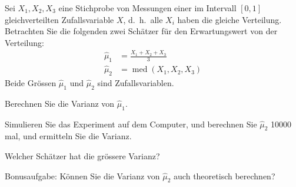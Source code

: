 Sei $X_1,X_2,X_3$ eine Stichprobe von Messungen einer im
Intervall $[0,1]$ gleichverteilten Zufallsvariable $X$,
d.~h.~alle $X_i$ haben die gleiche Verteilung. Betrachten Sie die folgenden
zwei Schätzer für den Erwartungswert von der Verteilung:
\begin{align*}
\hat\mu_1&=\frac{X_1+X_2+X_3}3\\
\hat\mu_2&=\operatorname{med}(X_1,X_2,X_3)
\end{align*}
Beide Grössen $\hat\mu_1$ und $\hat\mu_2$ sind Zufallsvariablen.
\begin{teilaufgaben}
\item
Berechnen Sie die Varianz von $\hat\mu_1$.
\item
Simulieren Sie das Experiment auf dem Computer, und berechnen Sie
$\hat\mu_2$ 10000 mal, und ermitteln Sie die Varianz.
\item
Welcher Schätzer hat die grössere Varianz?
\item
Bonusaufgabe:
Können Sie die Varianz von $\hat\mu_2$ auch theoretisch
berechnen?
\end{teilaufgaben}


